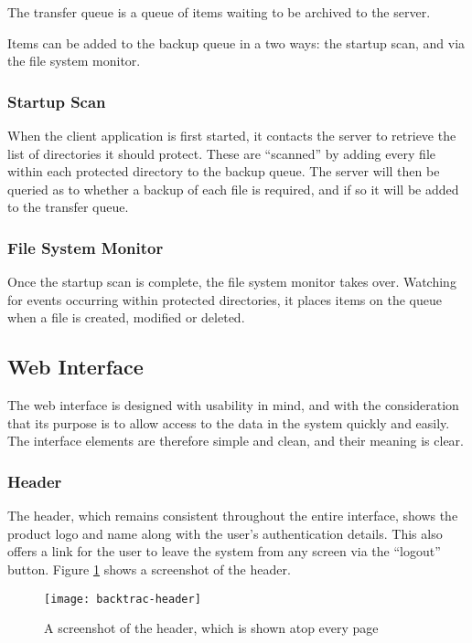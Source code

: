 The transfer queue is a queue of items waiting to be archived to the server.

Items can be added to the backup queue in a two ways: the startup scan, and via
the file system monitor.

\subsubsection{Startup Scan}

When the client application is first started, it contacts the server to
retrieve the list of directories it should protect. These are ``scanned'' by
adding every file within each protected directory to the backup queue. The
server will then be queried as to whether a backup of each file is required,
and if so it will be added to the transfer queue.

\subsubsection{File System Monitor}

Once the startup scan is complete, the file system monitor takes over. Watching
for events occurring within protected directories, it places items on the queue
when a file is created, modified or deleted.

\subsection{Web Interface}

The web interface is designed with usability in mind, and with the
consideration that its purpose is to allow access to the data in the system
quickly and easily. The interface elements are therefore simple and clean, and
their meaning is clear.

\subsubsection{Header}

The header, which remains consistent throughout the entire interface, shows the
product logo and name along with the user's authentication details. This also
offers a link for the user to leave the system from any screen via the
``logout'' button.  Figure \ref{fig:backtrac-header} shows a screenshot of the
header.

\begin{figure}
    \begin{center}
        \texttt{[image: backtrac-header]}
    \end{center}
    \caption{A screenshot of the header, which is shown atop every page}
    \label{fig:backtrac-header}
\end{figure}

